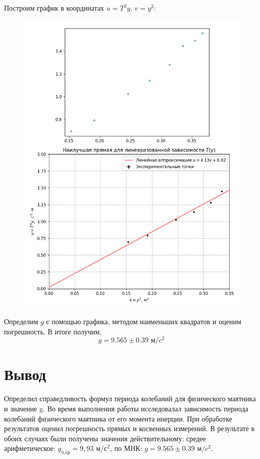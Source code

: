 \documentclass[a4paper,12pt]{article}
\begin{document}
Построим график в координатах $u=T^2y$, $v = y^2$:
\begin{figure}[H]
\begin{center}
\includegraphics[width=1\textwidth]{U(v)}
\end{center}
\end{figure}

Определим $g$ с помощью графика, методом наименьших квадратов и оценим погрешность. В итоге получим, \[g=9.565 \pm 0.39 \mbox{ м/}c^2\]

\section{Вывод}
Определил справедливость формул периода колебаний для физического маятника и значение g. Во время выполнения работы исследовалал зависимость периода колебаний физического маятника от его момента инерции. При обработке результатов оценил погрешность прямых и косвенных измерений. В результате в обоих случаях были получены значения действительному: средее арифметическое: $g_{\mbox{b,ср}} = 9,93$ м/с$^2$, по МНК: $g=9.565 \pm 0.39 \mbox{ м/}c^2$.
\end{document}
